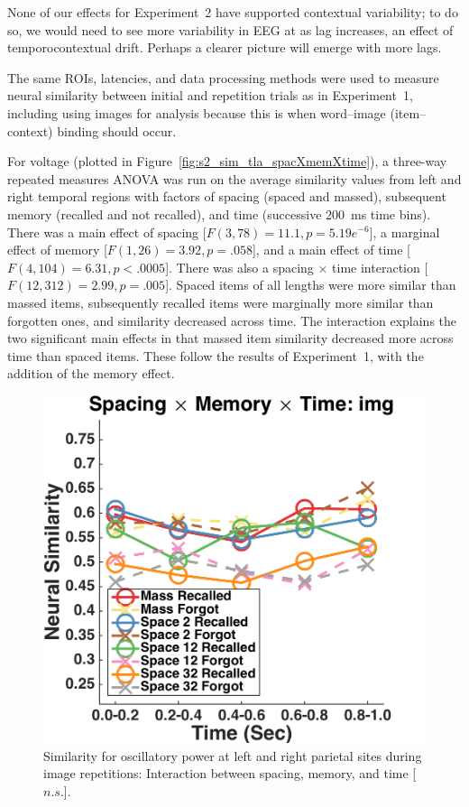 
None of our effects for Experiment~2 have supported contextual variability; to do so, we would need to see more variability in EEG at as lag increases, an effect of temporocontextual drift.
Perhaps a clearer picture will emerge with more lags.


The same ROIs, latencies, and data processing methods were used to measure neural similarity between initial and repetition trials as in Experiment~1, including using images for analysis because this is when word--image (item--context) binding should occur.
 

For voltage (plotted in Figure~\ref{fig:s2_sim_tla_spacXmemXtime}), a three-way repeated measures ANOVA was run on the average similarity values from left and right temporal regions with factors of spacing (spaced and massed), subsequent memory (recalled and not recalled), and time (successive 200~ms time bins).  There was a main effect of spacing [$F(3,78)=11.1, p=5.19e^{-6}$], a marginal effect of memory [$F(1,26)=3.92, p=.058$], and a main effect of time [$F(4,104)=6.31, p<.0005$].  There was also a spacing $\times$ time interaction [$F(12,312)=2.99, p=.005$].  Spaced items of all lengths were more similar than massed items, subsequently recalled items were marginally more similar than forgotten ones, and similarity decreased across time.  The interaction explains the two significant main effects in that massed item similarity decreased more across time than spaced items.  These follow the results of Experiment~1, with the addition of the memory effect.

\begin{figure}[H]
  \centering
  \includegraphics[width=.40\textwidth]{./figs/exp2/similarity_spacXmemXtime_img_pow_LPSRPS_0to200_200to400_400to600_600to800_800to1000_kaiser_cosine}
  \caption{Similarity for oscillatory power at left and right parietal sites during image repetitions: Interaction between spacing, memory, and time [$n.s.$].}
  \label{fig:s2_sim_pow_spacXmemXtime}
\end{figure}

